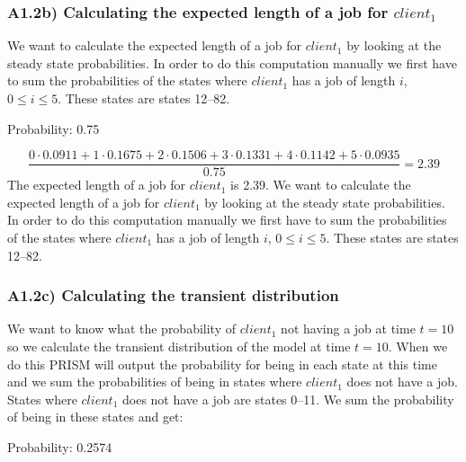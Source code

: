 \documentclass[12pt]{report}
\begin{document}
\subsubsection*{A1.2b) Calculating the expected length of a job for $client_1$}
We want to calculate the expected length of a job for $client_1$ by looking at the steady state probabilities. In order to do this computation manually we first have to sum the probabilities of the states where $client_1$ has a job of length $i$, $0 \leq i \leq 5$. These states are states 12--82.
\begin{center}
Probability: 0.75
\end{center}

$$\frac{0 \cdot 0.0911 + 1 \cdot 0.1675 + 2 \cdot 0.1506 + 3 \cdot 0.1331 + 4 \cdot 0.1142 + 5 \cdot 0.0935}{0.75} = 2.39$$
The expected length of a job for $client_1$ is 2.39.
We want to calculate the expected length of a job for $client_1$ by looking at the steady state probabilities. In order to do this computation manually we first have to sum the probabilities of the states where $client_1$ has a job of length $i$, $0 \leq i \leq 5$. These states are states 12--82.

\subsubsection*{A1.2c) Calculating the transient distribution}
We want to know what the probability of $client_1$ not having a job at time $t = 10$ so we calculate the transient distribution of the model at time $t = 10$. When we do this PRISM will output the probability for being in each state at this time and we sum the probabilities of being in states where $client_1$ does not have a job. States where $client_1$ does not have a job are states 0--11. We sum the probability of being in these states and get:
\begin{center}
Probability: 0.2574
\end{center}
\end{document}
